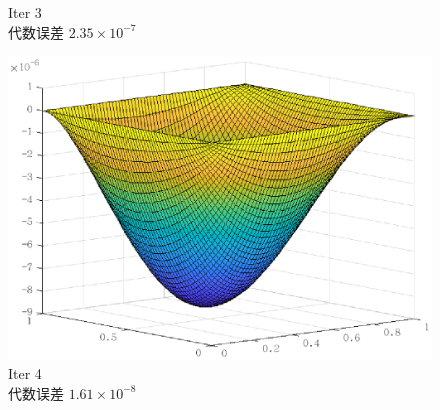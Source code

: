 \documentclass[lang=cn,10pt]{elegantbook}
\begin{document}
\begin{figure}[H]
\begin{minipage}[t]{0.22\linewidth}
    \caption*{\small Iter 3 \\ 代数误差 $2.35\times 10^{-7}$}
  \end{minipage}
  \hspace{1em}
  \begin{minipage}[t]{0.22\linewidth}
    \centering
    \includegraphics[width=0.84\linewidth]{figure/2-5-8.eps}
    \caption*{\small Iter 4 \\ 代数误差 $1.61\times 10^{-8}$}
  \end{minipage}
\end{figure}
\end{document}
